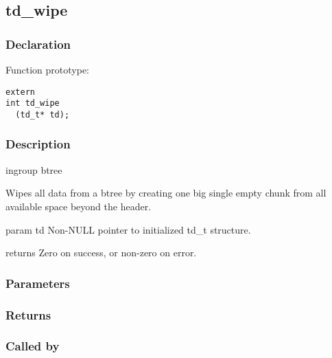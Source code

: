 
\newpage
\subsection{td\_wipe}
\subsubsection{Declaration} Function prototype:

\begin{verbatim}
extern
int td_wipe
  (td_t* td);
\end{verbatim}

\subsubsection{Description}


 ingroup btree

 Wipes all data from a btree by creating one big single empty chunk
 from all available space beyond the header.

 param td Non-NULL pointer to initialized td\_t structure.

 returns Zero on success, or non-zero on error.
 

\subsubsection{Parameters}
\subsubsection{Returns}
\subsubsection{Called by}

